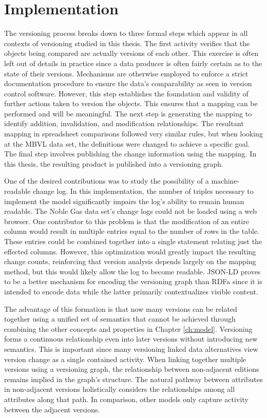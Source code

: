 \section{Implementation}

The versioning process breaks down to three formal steps which appear in all contexts of versioning studied in this thesis.
The first activity verifies that the objects being compared are actually versions of each other.
This exercise is often left out of details in practice since a data producer is often fairly certain as to the state of their versions.
Mechanisms are otherwise employed to enforce a strict documentation procedure to ensure the data's comparability as seen in version control software.
However, this step establishes the foundation and validity of further actions taken to version the objects.
This ensures that a mapping can be performed and will be meaningful.
The next step is generating the mapping to identify addition, invalidation, and modification relationships.
The resultant mapping in spreadsheet comparisons followed very similar rules, but when looking at the MBVL data set, the definitions were changed to achieve a specific goal.
The final step involves publishing the change information using the mapping.
In this thesis, the resulting product is published into a versioning graph.

One of the desired contributions was to study the possibility of a machine-readable change log.
In this implementation, the number of triples necessary to implement the model significantly impairs the log's ability to remain human readable.
The Noble Gas data set's change logs could not be loaded using a web browser.
One contributor to this problem is that the modification of an entire column would result in multiple entries equal to the number of rows in the table.
These entries could be combined together into a single statement relating just the effected columns.
However, this optimization would greatly impact the resulting change counts, reinforcing that version analysis depends largely on the mapping method, but this would likely allow the log to become readable.
JSON-LD proves to be a better mechanism for encoding the versioning graph than RDFa since it is intended to encode data while the latter primarily contextualizes visible content.

The advantage of this formation is that now many versions can be related together using a unified set of semantics that cannot be achieved through combining the other concepts and properties in Chapter \ref{ch:model}.
Versioning forms a continuous relationship even into later versions without introducing new semantics.
This is important since many versioning linked data alternatives view version change as a single contained activity.
When linking together multiple versions using a versioning graph, the relationship between non-adjacent editions remains implied in the graph's structure.
The natural pathway between attributes in non-adjacent versions holistically considers the relationships among all attributes along that path.
In comparison, other models only capture activity between the adjacent versions.

